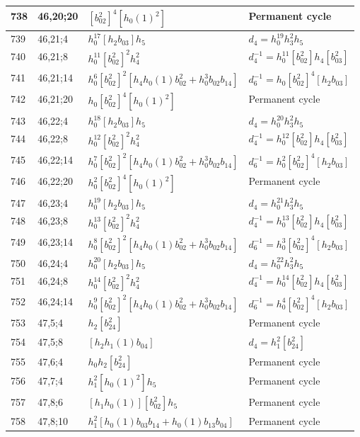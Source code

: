 \documentclass{article}
\begin{document}
\begin{longtable}{|l|l|>{\raggedright\arraybackslash}p{6cm}|>{\raggedright\arraybackslash}p{6cm}|}
\hline
738 & 46,20;20 & $[b_{02}^2]^4[h_0(1)^2]$ & Permanent cycle\\
\hline
739 & 46,21;4 & $h_0^{17}[h_2b_{03}]h_5$ &$d_{4}=h_0^{19}h_3^2h_5$\\
\hline
740 & 46,21;8 & $h_0^{11}[b_{02}^2]^2h_4^2$ & $d_{4}^{-1}=h_0^{11}[b_{02}^2]h_4[b_{03}^2]$\\
\hline
741 & 46,21;14 & $h_0^6[b_{02}^2]^2[h_4h_0(1)b_{02}^2 + h_0^3b_{02}b_{14}]$ & $d_{6}^{-1}=h_0[b_{02}^2]^4[h_2b_{03}]$\\
\hline
742 & 46,21;20 & $h_0[b_{02}^2]^4[h_0(1)^2]$ & Permanent cycle\\
\hline
743 & 46,22;4 & $h_0^{18}[h_2b_{03}]h_5$ &$d_{4}=h_0^{20}h_3^2h_5$\\
\hline
744 & 46,22;8 & $h_0^{12}[b_{02}^2]^2h_4^2$ & $d_{4}^{-1}=h_0^{12}[b_{02}^2]h_4[b_{03}^2]$\\
\hline
745 & 46,22;14 & $h_0^7[b_{02}^2]^2[h_4h_0(1)b_{02}^2 + h_0^3b_{02}b_{14}]$ & $d_{6}^{-1}=h_0^2[b_{02}^2]^4[h_2b_{03}]$\\
\hline
746 & 46,22;20 & $h_0^2[b_{02}^2]^4[h_0(1)^2]$ & Permanent cycle\\
\hline
747 & 46,23;4 & $h_0^{19}[h_2b_{03}]h_5$ &$d_{4}=h_0^{21}h_3^2h_5$\\
\hline
748 & 46,23;8 & $h_0^{13}[b_{02}^2]^2h_4^2$ & $d_{4}^{-1}=h_0^{13}[b_{02}^2]h_4[b_{03}^2]$\\
\hline
749 & 46,23;14 & $h_0^8[b_{02}^2]^2[h_4h_0(1)b_{02}^2 + h_0^3b_{02}b_{14}]$ & $d_{6}^{-1}=h_0^3[b_{02}^2]^4[h_2b_{03}]$\\
\hline
750 & 46,24;4 & $h_0^{20}[h_2b_{03}]h_5$ &$d_{4}=h_0^{22}h_3^2h_5$\\
\hline
751 & 46,24;8 & $h_0^{14}[b_{02}^2]^2h_4^2$ & $d_{4}^{-1}=h_0^{14}[b_{02}^2]h_4[b_{03}^2]$\\
\hline
752 & 46,24;14 & $h_0^9[b_{02}^2]^2[h_4h_0(1)b_{02}^2 + h_0^3b_{02}b_{14}]$ & $d_{6}^{-1}=h_0^4[b_{02}^2]^4[h_2b_{03}]$\\
\hline
753 & 47,5;4 & $h_2[b_{24}^2]$ & Permanent cycle\\
\hline
754 & 47,5;8 & $[h_2h_1(1)b_{04}]$ &$d_{4}=h_1^2[b_{24}^2]$\\
\hline
755 & 47,6;4 & $h_0h_2[b_{24}^2]$ & Permanent cycle\\
\hline
756 & 47,7;4 & $h_1^2[h_0(1)^2]h_5$ & Permanent cycle\\
\hline
757 & 47,8;6 & $[h_1h_0(1)][b_{02}^2]h_5$ & Permanent cycle\\
\hline
758 & 47,8;10 & $h_1^2[h_0(1)b_{03}b_{14} + h_0(1)b_{13}b_{04}]$ & Permanent cycle\\

\end{longtable}
\end{document}

